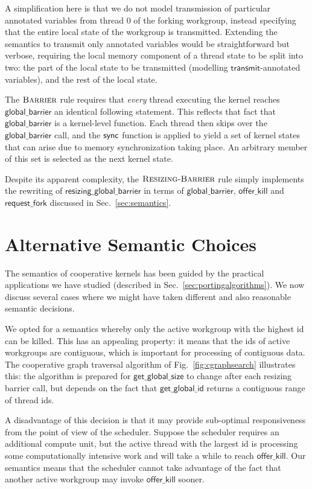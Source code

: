 \documentclass[sigconf]{acmart}
\newcommand{\myfig}{Fig.~}
\newcommand{\mysec}{Sec.~}
\newcommand{\transmit}{\mathsf{transmit}}
\newcommand{\offerfork}{\mathsf{request\_fork}}
\newcommand{\offerkill}{\mathsf{offer\_kill}}
\newcommand{\globalbarrier}{\mathsf{global\_barrier}}
\newcommand{\resizingglobalbarrier}{\mathsf{resizing\_global\_barrier}}
\newcommand{\getglobalid}{\mathsf{get\_global\_id}}
\newcommand{\getglobalsize}{\mathsf{get\_global\_size}}
\begin{document}
{A simplification here is that we do not model transmission of
particular annotated variables from thread 0 of the forking workgroup,
instead specifying that the entire local state of the workgroup is
transmitted.  Extending the semantics to transmit only annotated
variables would be straightforward but verbose, requiring the local
memory component of a thread state to be split into two: the part of
the local state to be transmitted (modelling $\transmit$-annotated
variables), and the rest of the local state.

The $\textsc{Barrier}$ rule requires that \emph{every} thread
executing the kernel reaches $\globalbarrier$ an identical following
statement.  This reflects that fact that $\globalbarrier$ is a
kernel-level function.  Each thread then skips over the
$\globalbarrier$ call, and the $\mathsf{sync}$ function is applied to yield
a set of kernel states that can arise due to memory synchronization
taking place.  An arbitrary member of this set is selected as the next
kernel state.

Despite its apparent complexity, the $\textsc{Resizing-Barrier}$ rule simply implements the rewriting of $\resizingglobalbarrier$ in terms of $\globalbarrier$, $\offerkill$ and $\offerfork$ discussed in \mysec\ref{sec:semantics}.


\section{Alternative Semantic Choices}\label{appendix:semanticalternatives}

The semantics of cooperative kernels has been guided by the practical
applications we have studied (described in
\mysec\ref{sec:portingalgorithms}).  We now discuss several cases
where we might have taken different and also reasonable semantic
decisions.

%
We opted for a semantics whereby only the active workgroup with the
highest id can be killed.  This has an appealing property: it means
that the ids of active workgroups are contiguous, which is important
for processing of contiguous data.  The cooperative graph traversal
algorithm of \myfig\ref{fig:cgraphsearch} illustrates this: the
algorithm is prepared for $\getglobalsize$ to change after each
resizing barrier call, but depends on the fact that $\getglobalid$
returns a contiguous range of thread ids.

A disadvantage of this decision is that it may provide sub-optimal
responsiveness from the point of view of the scheduler.  Suppose the
scheduler requires an additional compute unit, but the active thread
with the largest id is processing some computationally intensive work
and will take a while to reach $\offerkill$.  Our semantics means that
the scheduler cannot take advantage of the fact that another active
workgroup may invoke $\offerkill$ sooner.

}
\end{document}
